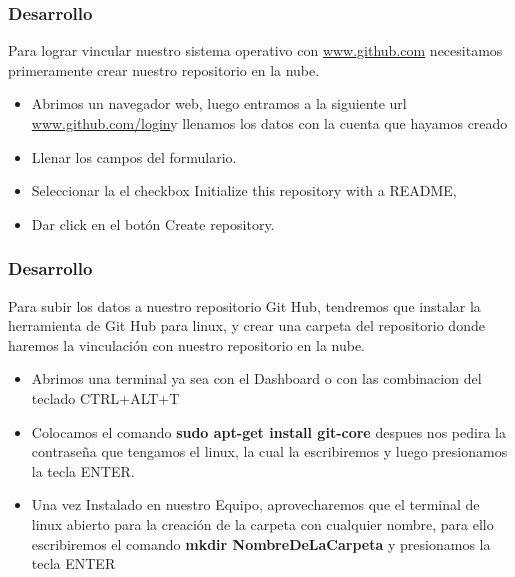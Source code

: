 \documentclass[8pt]{beamer}
\begin{document}
\begin{frame}
\frametitle{Desarrollo}


Para lograr vincular nuestro sistema operativo con \url{www.github.com} necesitamos primeramente crear nuestro repositorio en la nube. 

\setlength{\parskip}{03pt}
\begin{center}
\begin{itemize}
\item{Abrimos un navegador web, luego entramos a la siguiente url \url{www.github.com/login}y llenamos los datos con la cuenta que hayamos creado}
\item{Llenar los campos del formulario.}
\item{Seleccionar la el checkbox Initialize this repository with a README, }
\item{Dar click en el botón Create repository.}
\end{itemize} 



\setlength{\parskip}{08pt}
\end{center}
\end{frame}


\begin{frame}
\frametitle{Desarrollo}


Para subir los datos a nuestro repositorio Git Hub, tendremos que instalar la herramienta de Git Hub para linux, y crear una carpeta del repositorio donde haremos la vinculación con nuestro repositorio en la nube. 

\setlength{\parskip}{03pt}
\begin{center}
\begin{itemize}
\justifying
\item{Abrimos una terminal ya sea con el Dashboard o con las combinacion del teclado CTRL+ALT+T}
\item{Colocamos el comando \textbf{sudo apt-get install git-core} despues nos pedira la contraseña que tengamos el linux, la cual la escribiremos y luego presionamos la tecla ENTER.}
\justifying
\item{Una vez Instalado en nuestro Equipo, aprovecharemos que el terminal de linux abierto para la creación de la carpeta con cualquier nombre, para ello escribiremos el comando  \textbf{mkdir NombreDeLaCarpeta}  y presionamos la tecla ENTER}
\end{itemize} 

\setlength{\parskip}{08pt}
\end{center}
\end{frame}
\end{document}
